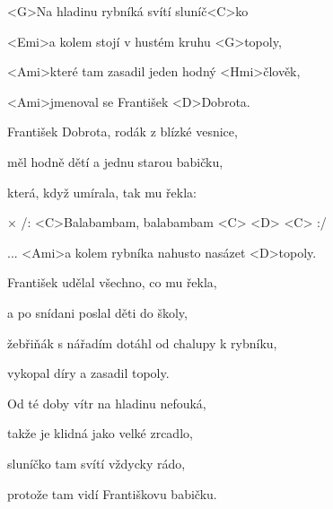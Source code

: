 

\zs
<G>Na hladinu rybníká svítí sluníč<C>ko

<Emi>a kolem stojí v hustém kruhu <G>topoly,

<Ami>které tam zasadil jeden hodný <Hmi>člověk,

<Ami>jmenoval se František <D>Dobrota.

\ks \zs
František Dobrota, rodák z blízké vesnice,

měl hodně dětí a jednu starou babičku,

která, když umírala, tak mu řekla: 
\ks

× /: <C>Balabambam, balabambam <C> <D> <C> :/

... <Ami>a kolem rybníka nahusto nasázet <D>topoly.
\kr

\zs
František udělal všechno, co mu řekla,

a po snídani poslal děti do školy,

žebřiňák s nářadím dotáhl od chalupy k rybníku,

vykopal díry a zasadil topoly.

\ks \zs
Od té doby vítr na hladinu nefouká,

takže je klidná jako velké zrcadlo,

sluníčko tam svítí vždycky rádo,

protože tam vidí Františkovu babičku.
\ks

\kp







